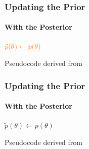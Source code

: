 \documentclass[9pt]{beamer}
\begin{document}
\begin{frame}
\frametitle{Updating the Prior}
\framesubtitle{With the Posterior}
\begin{algorithm}[H]
	$\color{orange}\tilde{p}(\theta) \leftarrow p(\theta)$\\
\end{algorithm}
\vspace{35pt}
\tiny Pseudocode derived from \cite{papamakarios2016fast}
\end{frame} 
\begin{frame}
\frametitle{Updating the Prior}
\framesubtitle{With the Posterior}
\begin{algorithm}[H]
	$\tilde{p}(\theta) \leftarrow p(\theta)$\\
\end{algorithm}
\vspace{35pt}
\tiny Pseudocode derived from \cite{papamakarios2016fast}
\end{frame} 
\end{document}
